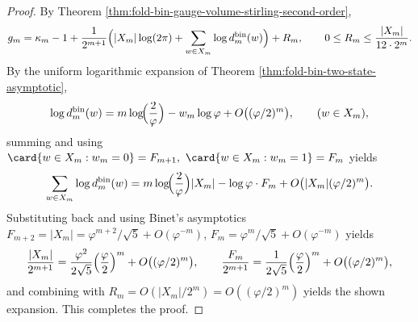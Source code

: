 \begin{proof}
By Theorem \ref{thm:fold-bin-gauge-volume-stirling-second-order},
\[
g_m=\kappa_m-1+\frac{1}{2^{m+1}}\Bigl(|X_m|\log(2\pi)+\sum_{w\in X_m}\log d^{\mathrm{bin}}_m(w)\Bigr)+R_m,
\qquad 0\le R_m\le \frac{|X_m|}{12\cdot 2^m}.
\]
By the uniform logarithmic expansion of Theorem \ref{thm:fold-bin-two-state-asymptotic},
\[
\log d^{\mathrm{bin}}_m(w)=m\log\!\Bigl(\frac{2}{\varphi}\Bigr)-w_m\log\varphi+O\bigl((\varphi/2)^m\bigr),
\qquad (w\in X_m),
\]
summing and using
\(
\card\{w\in X_m:w_m=0\}=F_{m+1},\ \card\{w\in X_m:w_m=1\}=F_m
\)
yields
\[
\sum_{w\in X_m}\log d^{\mathrm{bin}}_m(w)
=m\log\!\Bigl(\frac{2}{\varphi}\Bigr)|X_m|-\log\varphi\cdot F_m+O\bigl(|X_m|(\varphi/2)^m\bigr).
\]
Substituting back and using Binet's asymptotics \(F_{m+2}=|X_m|=\varphi^{m+2}/\sqrt5+O(\varphi^{-m})\), \(F_m=\varphi^m/\sqrt5+O(\varphi^{-m})\) yields
\[
\frac{|X_m|}{2^{m+1}}
=\frac{\varphi^2}{2\sqrt5}\Bigl(\frac{\varphi}{2}\Bigr)^m+O\bigl((\varphi/2)^m\bigr),
\qquad
\frac{F_m}{2^{m+1}}
=\frac{1}{2\sqrt5}\Bigl(\frac{\varphi}{2}\Bigr)^m+O\bigl((\varphi/2)^m\bigr),
\]
and combining with \(R_m=O(|X_m|/2^m)=O((\varphi/2)^m)\) yields the shown expansion. This completes the proof.
\end{proof}


